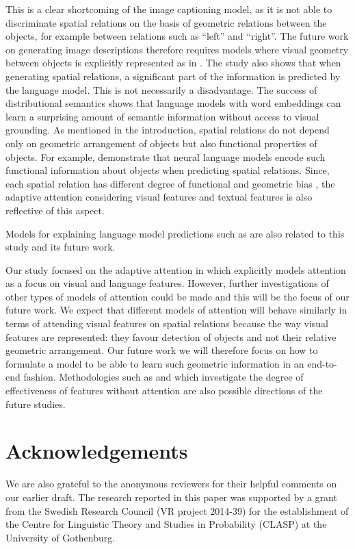 This is a clear shortcoming of the image captioning model, as it is not able to discriminate
spatial relations on the basis of geometric relations between the objects,
for example between relations such as ``left'' and ``right''. The future work
on generating image descriptions therefore requires models where visual geometry between
objects is explicitly represented as in \cite{Coventry:2005aa}. The study also
shows that when generating spatial relations, a significant part of the
information is predicted by the language model. This is not necessarily a
disadvantage. The success of distributional semantics shows that language
models with word embeddings can learn a surprising amount of semantic
information without access to visual grounding. As mentioned in the
introduction, spatial relations do not depend only on geometric arrangement of
objects but also functional properties of objects. For example,
\cite{dobnik-etal-2018-exploring} demonstrate that neural language models encode such
functional information about objects when predicting spatial relations. Since,
each spatial relation has different degree of functional and geometric bias
\cite{Coventry:2004aa}, the adaptive attention considering visual features and
textual features is also reflective of this aspect.

Models for explaining language model predictions such as \cite{park2016attentive} are also related to this study and its future work.

Our study focused on the adaptive attention in \cite{lu2017knowing} which
explicitly models attention as a focus on visual and language features.
However, further investigations of other types of models of attention could be
made and this will be the focus of our future work. We expect that different
models of attention will behave similarly in terms of attending visual features
on spatial relations
because the way visual features are represented: they favour detection of
objects and not their relative geometric arrangement. Our future work we will
therefore focus on how to formulate a model to be able to learn such geometric
information in an end-to-end fashion.
Methodologies such as \cite{ribeiro2016should} and \cite{selvaraju2017grad}
which investigate the degree of effectiveness of features without attention
are also possible directions of the future studies.

\section{Acknowledgements}
We are also grateful to the anonymous reviewers for their helpful comments on our earlier draft. The research reported in this paper was supported by a grant from the Swedish Research Council (VR project 2014-39) for the establishment of the Centre for Linguistic Theory and Studies in Probability (CLASP) at the University of Gothenburg.


